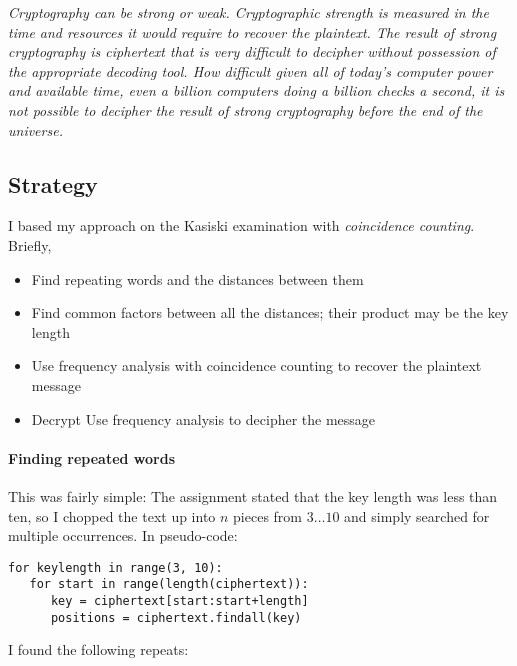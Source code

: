 \documentclass[a4paper,english,12pt]{article}
\begin{document}
\textit{Cryptography can be strong or weak. Cryptographic strength is measured
in the time and resources it would require to recover the plaintext.  The
result of strong cryptography is ciphertext that is very difficult to decipher
without possession of the appropriate decoding tool. How difficult given all of
today's computer power and available time, even a billion computers doing a
billion checks a second, it is not possible to decipher the result of strong
cryptography before the end of the universe.}

\subsection{Strategy}

I based my approach on the Kasiski examination\cite{dalkilic2000interactive,
wiki:kasiski.examination} with \textit{coincidence
counting}\cite{coincidence.friedman}. Briefly,

\begin{itemize}
  \item Find repeating words and the distances between them
  \item Find common factors between all the distances; their product may be the
    key length
  \item Use frequency analysis with coincidence counting to recover the
    plaintext message
  \item Decrypt Use frequency analysis to decipher the message
\end{itemize}

\paragraph{Finding repeated words}

This was fairly simple: The assignment stated that the key length was less than
ten, so I chopped the text up into $n$ pieces from $3\dots10$ and simply
searched for multiple occurrences. In pseudo-code:

\begin{verbatim}
for keylength in range(3, 10):
   for start in range(length(ciphertext)):
      key = ciphertext[start:start+length]
      positions = ciphertext.findall(key)
\end{verbatim}

I found the following repeats:
\end{document}
